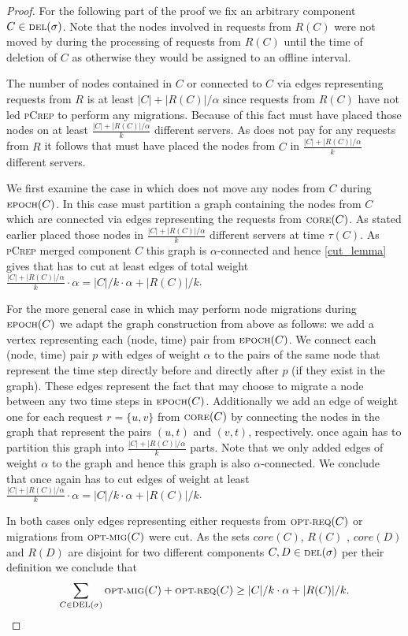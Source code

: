 \documentclass[a4paper,UKenglish,cleveref, autoref, thm-restate,authorcolumns]{lipics-v2019}
\newcommand{\adjDel}{\textsc{pCrep}}
\newcommand{\optmig}{\text{\scriptsize OPT-MIG}}
\newcommand{\optreq}{\text{\scriptsize OPT-REQ}}
\newcommand{\del}{\text{\scriptsize DEL}}
\newcommand{\opt}{\text{O{\scriptsize PT}}}
\newcommand{\core}{\text{\scriptsize CORE}}
\newcommand{\epoch}{\text{\scriptsize EPOCH}}
\begin{document}
\begin{proof}
	For the following part of the proof we fix an arbitrary component $C\in\del{}(\sigma)$. Note that the nodes involved in requests from $R(C)$ were not moved by \opt{} during the processing of requests from $R(C)$ until the time of deletion of $C$ as otherwise they would be assigned to an offline interval.
	
	The number of nodes contained in $C$ or connected to $C$ via edges representing requests from $R$ is at least $|C|+|R(C)|/\alpha$ since requests from $R(C)$ have not led \adjDel{} to perform any migrations. Because of this fact \opt{} must have placed those nodes on at least $\frac{|C|+|R(C)|/\alpha}{k}$ different servers. As \opt{} does not pay for any requests from $R$ it follows that \opt{} must have placed the nodes from $C$ in $\frac{|C|+|R(C)|/\alpha}{k}$ different servers.
	
	We first examine the case in which \opt{} does not move any nodes from $C$ during $\epoch(C)$. In this case \opt{} must partition a graph containing the nodes from $C$ which are connected via edges representing the requests from $\core(C)$. As stated earlier \opt{} placed those nodes in $\frac{|C|+|R(C)|/\alpha}{k}$ different servers at time $\tau(C)$. As \adjDel{} merged component $C$ this graph is $\alpha$-connected and hence \cref{cut_lemma} gives that \opt{} has to cut at least edges of total weight $\frac{|C|+|R(C)|/\alpha}{k}\cdot\alpha=|C|/k\cdot\alpha+|R(C)|/k$.
	
	For the more general case in which \opt{} may perform node migrations during $\epoch(C)$ we adapt the graph construction from above as follows: we add a vertex representing each (node, time) pair from $\epoch(C)$.
	We connect each (node, time) pair $p$ with edges of weight $\alpha$ to the pairs of the same node that represent the time step directly before and directly after $p$ (if they exist in the graph). These edges represent the fact that \opt{} may choose to migrate a node between any two time steps in $\epoch(C)$.
	Additionally we add an edge of weight one for each request $r=\{u,v\}$ from $\core(C)$ by connecting the nodes in the graph that represent the pairs $(u,t)$ and $(v,t)$, respectively. \opt{} once again has to partition this graph into $\frac{|C|+|R(C)|/\alpha}{k}$ parts.
	Note that we only added edges of weight $\alpha$ to the graph and hence this graph is also $\alpha$-connected. We conclude that once again \opt{} has to cut edges of weight at least $\frac{|C|+|R(C)|/\alpha}{k}\cdot\alpha=|C|/k\cdot\alpha+|R(C)|/k$.
	
	In both cases only edges representing either requests from $\optreq(C)$ or migrations from $\optmig(C)$ were cut.
	As the sets $core(C)$, $R(C)$ , $core(D)$ and $R(D)$ are disjoint for two different components $C,D\in\del(\sigma)$ per their definition we conclude that
	\begin{align*}
	\sum_{C\in\del(\sigma)}\optmig(C)+\optreq(C)\geq |C|/k\cdot\alpha+|R(C)|/k.
	\end{align*}
\end{proof}
\end{document}
